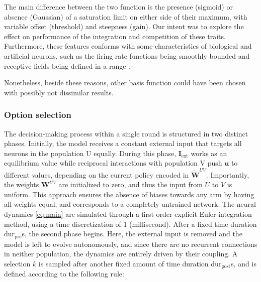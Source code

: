 The main difference between the two function is the presence (sigmoid) or absence (Gaussian) of a saturation limit on either side of their maximum, with variable offset (threshold) and steepness (gain).
Our intent was to explore the effect on performance of the integration and competition of these traits.
Furthermore, these features conforms with some characteristics of biological and artificial neurons, such as the firing rate functions being smoothly bounded and receptive fields being defined in a range \cite{buttsTuningCurvesNeuronal2006, millerCombinedMechanismsNeural2019, ockerFlexibleNeuralConnectivity2020, apicellaSurveyModernTrainable2021}.

Nonetheless, beside these reasons, other basis function could have been chosen with possibly not dissimilar results.


\subsubsection{Option selection}
The decision-making process within a single round is structured in two distinct phases. Initially, the model receives a constant external input that targets all neurons in the population U equally.
During this phase, $\textbf{I}_{\text{ext}}$ works as an equilibrium value while reciprocal interactions with population V push $\textbf{u}$ to different values, depending on the current policy encoded in $\widetilde{\textbf{W}}^{UV}$.
Importantly, the weights $\textbf{W}^{UV}$ are initialized to zero, and thus the input from $U$ to $V$ is uniform. This approach ensures the absence of biases towards any arm by having all weights equal, and corresponds to a completely untrained network.
The neural dynamics \ref{eq:main} are simulated through a first-order explicit Euler integration method, using a time discretization of 1 (millisecond).
After a fixed time duration $\text{dur}_{\text{pre}}$s, the second phase begins.
Here, the external input is removed and the model is left to evolve autonomously, and since there are no recurrent connections in neither population, the dynamics are entirely driven by their coupling.
A selection $k$ is sampled after another fixed amount of time duration $\text{dur}_{\text{post}}$s, and is defined according to the following rule:

